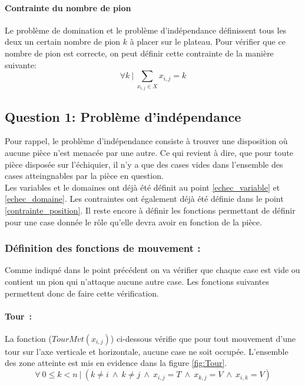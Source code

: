 \documentclass[a4paper,11pt]{article}
\newcommand{\AND}{~\wedge~}
\newcommand{\TQ}{~|~}
\begin{document}
            \paragraph{Contrainte du nombre de pion}
                \label{nbr_pion}
                Le problème de domination et le problème d'indépendance définissent tous les deux un certain nombre de pion $k$ à placer sur le plateau.  Pour vérifier que ce nombre de pion est correcte, on peut définir cette contrainte de la manière suivante:
                \[\forall k \TQ \sum\limits_{x_{i, j} \in X} x_{i, j} = k \]
        
        
    \subsection{Question 1: Problème d'indépendance}
        Pour rappel, le problème d'indépendance consiste à trouver une disposition où aucune pièce n'est menacée par une autre. Ce qui revient à dire, que pour toute pièce disposée sur l'échiquier, il n'y a que des cases vides dans l'ensemble des cases atteingnables par la pièce en question.\\
        Les variables et le domaines ont déjà été définit au point \ref{echec_variable} et \ref{echec_domaine}.  Les contraintes ont également déjà été définie dans le point \ref{contrainte_position}.  Il reste encore à définir les fonctions permettant de définir pour une case donnée le rôle qu'elle devra avoir en fonction de la pièce.
            
        \subsubsection{Définition des fonctions de mouvement :}
            \label{independance_def_mvt}
            Comme indiqué dans le point précédent on va vérifier que chaque case est vide ou contient un pion qui n'attaque aucune autre case.  Les fonctions suivantes permettent donc de faire cette vérification.
            
          \paragraph{Tour~:} La fonction ($TourMvt(x_{i, j})$) ci-dessous vérifie que pour tout mouvement d'une tour sur l'axe verticale et horizontale, aucune case ne soit occupée. L'ensemble des zone atteinte est mis en evidence dans la figure \ref{fig:Tour}.
            \[\forall~0 \leq k < n \TQ (k \neq i \AND k \neq j \AND x_{i, j} = T \AND x_{k, j} = V \AND x_{i, k} = V)\]
            
\end{document}
